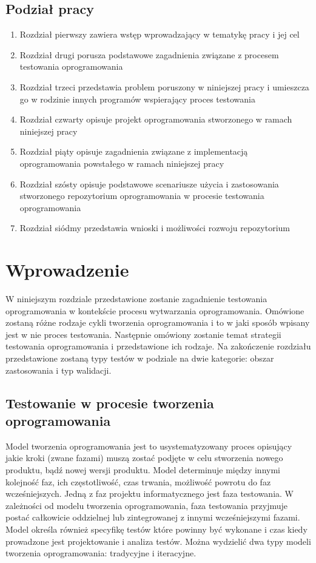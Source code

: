 \section{Podział pracy}
\begin{enumerate}
  \item Rozdział pierwszy zawiera wstęp wprowadzający w tematykę pracy i jej  cel
  \item Rozdział drugi porusza podstawowe zagadnienia związane z procesem testowania oprogramowania
  \item Rozdział trzeci przedstawia problem poruszony w niniejszej pracy i umieszcza go w rodzinie innych programów wspierający proces testowania
  \item Rozdział czwarty opisuje projekt oprogramowania stworzonego w ramach niniejszej pracy
  \item Rozdział piąty opisuje zagadnienia związane z implementacją oprogramowania powstałego w ramach niniejszej pracy
  \item Rozdział szósty opisuje podstawowe scenariusze użycia i zastosowania stworzonego repozytorium oprogramowania w procesie testowania oprogramowania
  \item Rozdział siódmy przedstawia wnioski i możliwości rozwoju repozytorium 
\end{enumerate}


\chapter{Wprowadzenie}
W niniejszym rozdziale przedstawione zostanie zagadnienie testowania oprogramowania w kontekście procesu wytwarzania oprogramowania. Omówione zostaną różne rodzaje cykli tworzenia oprogramowania i to w jaki sposób wpisany jest w nie proces testowania. Następnie omówiony zostanie temat strategii testowania oprogramowania i przedstawione ich rodzaje. Na zakończenie rozdziału przedstawione zostaną typy testów w podziale na dwie kategorie: obszar zastosowania i typ walidacji.
\section{Testowanie w procesie tworzenia oprogramowania}
\label{sec:testowanieWprocesie}
Model tworzenia oprogramowania jest to usystematyzowany proces opisujący jakie kroki (zwane fazami) muszą zostać podjęte w celu stworzenia nowego produktu, bądź nowej wersji produktu. Model determinuje między innymi kolejność faz, ich częstotliwość, czas trwania, możliwość powrotu do faz wcześniejszych. Jedną z faz projektu informatycznego jest faza testowania. W zależności od modelu tworzenia oprogramowania, faza testowania przyjmuje postać całkowicie oddzielnej lub zintegrowanej z innymi wcześniejszymi fazami. Model określa również specyfikę testów które powinny być wykonane  i czas kiedy prowadzone jest projektowanie i analiza testów.
Można wydzielić dwa typy modeli tworzenia oprogramowania: tradycyjne i iteracyjne.  
